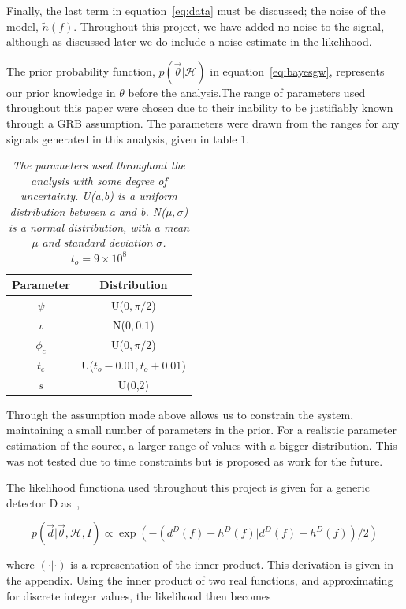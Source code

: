 \documentclass[12pt]{iopart}
\newcommand{\curlH}{\mathcal{H}}
\begin{document}
Finally, the last term in equation~\ref{eq:data} must be discussed; the noise
of the model, $\tilde{n}(f)$. Throughout this project, we have added no noise
to the signal, although as discussed later we do include a noise estimate in
the likelihood.

The prior probability function, $p(\vec{\theta} | \curlH)$ in
equation~\ref{eq:bayesgw}, represents our prior knowledge in $\theta$ before
the analysis.The range of parameters used throughout this paper were chosen due
to their inability to be justifiably known through a GRB assumption. The
parameters were drawn from the ranges for any signals generated in this
analysis, given in table 1.

\begin{table}
  \centering
  \begin{tabular}{|c|c|}
    \hline
    Parameter & Distribution \\
    \hline
    $\psi$   &  U($0,\pi/2$)\\
    $\iota$   & N($0,0.1$) \\
    $\phi_c$  & U($0,\pi/2$)\\
    $t_c$     & U($t_{o}-0.01, t_{o}+0.01$) \\
    $s$       & U(0,2) \\
    \hline
  \end{tabular}
  \label{tab:prior}
  \caption{\textit{The parameters used throughout the analysis with some degree
of uncertainty. U(a,b) is a uniform distribution between a and b. N($\mu,
\sigma$) is a normal distribution, with a mean $\mu$ and standard deviation
$\sigma$. $t_{o} = 9\times10^{8}$}}
\end{table}

Through the assumption made above allows us to constrain the system,
maintaining a small number of parameters in the prior. For a realistic
parameter estimation of the source, a larger range of values with a bigger
distribution. This was not tested due to time constraints but is proposed as
work for the future.

The likelihood functiona used throughout this project is given for a generic
detector D as~\cite{JVei},

\begin{equation}
  p(\vec{d} | \vec{\theta}, \curlH, I) \propto \exp(-(d^{D}(f) -
h^{D}(f)|d^{D}(f) - h^{D}(f))/2)
\end{equation}

where $(\cdot |\cdot )$ is a representation of the inner product. This
derivation is given in the appendix. Using the inner product of two real
functions, and approximating for discrete integer values, the likelihood then
becomes
\end{document}

